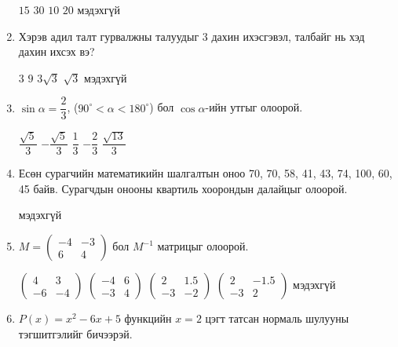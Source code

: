 \documentclass{exam}
\begin{document}
\begin{enumerate}
\begin{oneparchoices}
 \choice $15$
 \choice $30$ 
 \choice $10$  
 \choice $20$
 \choice мэдэхгүй
\end{oneparchoices}
 \item Хэрэв адил талт гурвалжны талуудыг $3$ дахин ихэсгэвэл, талбайг нь хэд дахин ихсэх вэ? 

\begin{oneparchoices}
 \choice $3$
 \choice $9$ 
 \choice $3\sqrt{3}$  
 \choice $\sqrt{3}$
 \choice мэдэхгүй
\end{oneparchoices}
 \item $\sin \alpha = \dfrac{2}{3}$, ($90^\circ < \alpha < 180^\circ$) бол $\cos \alpha$-ийн утгыг олоорой.
    
        \begin{oneparchoices}
            \choice $\dfrac{\sqrt{5}}{3}$
            \choice $-\dfrac{\sqrt{5}}{3}$
            \choice $\dfrac{1}{3}$
            \choice $-\dfrac{2}{3}$
            \choice $\dfrac{\sqrt{13}}{3}$
        \end{oneparchoices}
 \item  Есөн сурагчийн математикийн шалгалтын оноо 70, 70, 58, 41, 43, 74, 100, 60, 45 байв. Сурагчдын онооны квартиль хоорондын далайцыг олоорой.
    
        \begin{oneparchoices}
            \choice мэдэхгүй
        \end{oneparchoices}
 \item $M = \begin{pmatrix} -4 & -3\\ 6 & 4\end{pmatrix}$ бол $M^{-1}$ матрицыг олоорой.
    
        \begin{oneparchoices}
            \choice $\begin{pmatrix} 4 & 3\\ -6 & -4\end{pmatrix}$
            \choice $\begin{pmatrix} -4 & 6\\ -3 & 4\end{pmatrix}$
            \choice $\begin{pmatrix} 2 & 1.5\\ -3 & -2\end{pmatrix}$
            \choice $\begin{pmatrix} 2 & -1.5\\ -3 & 2\end{pmatrix}$
            \choice мэдэхгүй
        \end{oneparchoices}
 \item $P(x) = x^2-6x+5$ функцийн $x=2$ цэгт татсан нормаль шулууны тэгшитгэлийг бичээрэй.
    

\end{enumerate}
\end{document}

